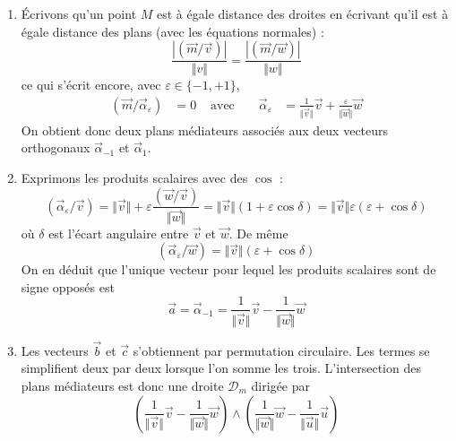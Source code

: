 \begin{enumerate}
\begin{enumerate}
\item \'Ecrivons qu'un point $M$ est à égale distance des droites en écrivant qu'il est à égale distance des plans (avec les équations normales) :
\begin{displaymath}
 \frac{\left| (\overrightarrow m / \overrightarrow v)\right|}{\Vert v \Vert}
=
 \frac{\left| (\overrightarrow m / \overrightarrow w)\right|}{\Vert w \Vert}
\end{displaymath}
ce qui s'écrit encore, avec $\varepsilon \in \{-1,+1\}$,
\begin{align*}
 (\overrightarrow m / \overrightarrow \alpha_\varepsilon) &= 0
  & \text{ avec } &  &
 \overrightarrow \alpha_\varepsilon &= 
 \frac{1}{\Vert \overrightarrow v \Vert}\overrightarrow v
+ \frac{\varepsilon}{\Vert \overrightarrow w \Vert}\overrightarrow w
\end{align*}
On obtient donc deux plans médiateurs associés aux deux vecteurs orthogonaux $\overrightarrow\alpha_{-1}$ et $\overrightarrow\alpha_{1}$.
\item Exprimons les produits scalaires avec des $\cos$ :
\begin{equation*}
 (\overrightarrow\alpha_\varepsilon / \overrightarrow v) = 
\Vert \overrightarrow v \Vert + \varepsilon \frac{(\overrightarrow w / \overrightarrow v)}{\Vert \overrightarrow w \Vert} =
\Vert \overrightarrow v \Vert(1+\varepsilon \cos \delta) = 
\Vert \overrightarrow v \Vert \varepsilon(\varepsilon + \cos \delta)
\end{equation*}
où $\delta$ est l'écart angulaire entre $\overrightarrow v$ et $\overrightarrow w$. De même
\begin{displaymath}
  (\overrightarrow\alpha_\varepsilon / \overrightarrow w) = 
\Vert \overrightarrow v \Vert (\varepsilon + \cos \delta)
\end{displaymath}
On en déduit que l'unique vecteur pour lequel les produits scalaires sont de signe opposés est
\begin{displaymath}
 \overrightarrow a = \overrightarrow \alpha_{-1} =
 \frac{1}{\Vert \overrightarrow v \Vert}\overrightarrow v
- \frac{1}{\Vert \overrightarrow w \Vert}\overrightarrow w
\end{displaymath}
\item Les vecteurs $\overrightarrow b$ et $\overrightarrow c$ s'obtiennent par permutation circulaire. Les termes se simplifient deux par deux lorsque l'on somme les trois. L'intersection des plans médiateurs est donc une droite $\mathcal D_m$ dirigée par
\begin{displaymath}
 \left(  \frac{1}{\Vert \overrightarrow v \Vert}\overrightarrow v
- \frac{1}{\Vert \overrightarrow w \Vert}\overrightarrow w
\right) 
\wedge
 \left(  \frac{1}{\Vert \overrightarrow w \Vert}\overrightarrow w
- \frac{1}{\Vert \overrightarrow u \Vert}\overrightarrow u
\right) 
\end{displaymath}
\end{enumerate}


\end{enumerate}
